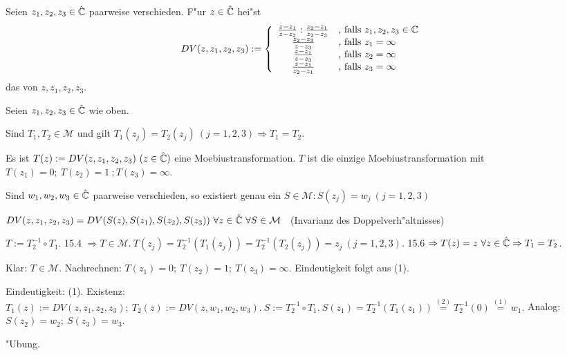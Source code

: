 \documentclass{article}
\begin{document}
\begin{definition}
Seien $z_1,z_2,z_3 \in \hat{\mathbb{C}}$ paarweise verschieden. F"ur $z \in \hat{\mathbb{C}}$ hei"st
\[
DV(z,z_1,z_2,z_3) := \left\{
\begin{array}{cl}
\frac{z-z_1}{z-z_3}:\frac{z_2-z_1}{z_2-z_3} & \mbox{, falls } z_1,z_2,z_3 \in \mathbb{C} \\
\frac{z_2-z_3}{z-z_3} & \mbox{, falls } z_1 = \infty \\
\frac{z-z_1}{z-z_3} & \mbox{, falls } z_2 = \infty \\
\frac{z-z_1}{z_2-z_1} & \mbox{, falls } z_3 = \infty
\end{array} \right.
\]
das  von $z,z_1,z_2,z_3$.
\end{definition}

\begin{satz}
Seien $z_1,z_2,z_3 \in \hat{\mathbb{C}}$ wie oben.
\begin{liste}
\item Sind $T_1,T_2 \in \mathcal{M}$ und gilt $T_1(z_j) = T_2(z_j) \ (j=1,2,3) \Rightarrow T_1 = T_2.$
\item Es ist $T(z) := DV(z,z_1,z_2,z_3) \ (z \in \hat{\mathbb{C}})$ eine Moebiustransformation. $T$ ist die einzige Moebiustransformation mit $T(z_1)=0; \ T(z_2) = 1 \ ; T(z_3) = \infty$.
\item Sind $w_1,w_2,w_3 \in \hat{\mathbb{C}}$ paarweise verschieden, so existiert genau ein $S \in \mathcal{M}: S(z_j) = w_j \ (j = 1,2,3)$
\item $DV(z,z_1,z_2,z_3) = DV(S(z),S(z_1),S(z_2),S(z_3)) \ \forall z \in \hat{\mathbb{C}} \ \forall S \in \mathcal{M}$ \ (Invarianz des Doppelverh"altnisses)
\end{liste}
\end{satz}

\begin{beweis}
\begin{liste}
\item $T := T_2^{-1} \circ T_1.$ 15.4 $\Rightarrow T \in \mathcal{M}.\ T(z_j) = T_2^{-1}(T_1(z_j)) = T_2^{-1}(T_2(z_j)) = z_j \ (j=1,2,3).$ 15.6 $\Rightarrow T(z) = z \ \forall z \in \hat{\mathbb{C}} \Rightarrow T_1 = T_2$.
\item Klar: $T \in \mathcal{M}$. Nachrechnen: $T(z_1) = 0; \ T(z_2) = 1; \ T(z_3) = \infty$. Eindeutigkeit folgt aus (1).
\item Eindeutigkeit: (1). Existenz: $T_1(z):= DV(z,z_1,z_2,z_3); \ T_2(z) := DV(z,w_1,w_2,w_3).\ S:= T_2^{-1}\circ T_1.\ S(z_1) = T_2^{-1}(T_1(z_1)) \stackrel{(2)}{=} T_2^{-1}(0) \stackrel{(1)}{=} w_1.$ Analog: $S(z_2) = w_2; \ S(z_3) = w_3.$
\item "Ubung.
\end{liste}
\end{beweis}
\end{document}
